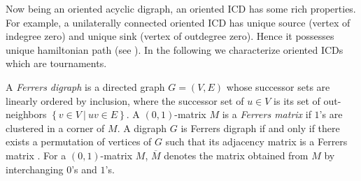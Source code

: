 \documentclass{article}
\theoremstyle{definition}
\numberwithin{equation}{section}
\newcommand{\set}[1]{\left\{#1\right\}}
\newcommand{\Set}[2]{\set{#1\ \vert\ #2}}
\begin{document}
\noindent
Now being an oriented acyclic digraph, an oriented ICD has some rich properties. For example, a unilaterally connected oriented ICD has unique source (vertex of indegree zero) and unique sink (vertex of outdegree zero). Hence it possesses unique hamiltonian path (see \cite{Bang}). In the following we characterize oriented ICDs which are tournaments.

\vspace{1em} \noindent 
A {\em Ferrers digraph} is a directed graph $G=(V, E)$ whose successor sets are linearly ordered by inclusion, where the successor set of $u\in V$ is its set of out-neighbors $\Set{v\in V}{uv \in E}$. A $(0,1)$-matrix $M$ is a {\em Ferrers matrix} if $1$'s are clustered in a corner of $M$. A digraph $G$ is Ferrers digraph if and only if there exists a permutation of vertices of $G$ such that its adjacency matrix is a Ferrers matrix \cite{BDGS}. For a $(0,1)$-matrix $M$, $\overline{M}$ denotes the matrix obtained from $M$ by interchanging $0$'s and $1$'s.
\end{document}
